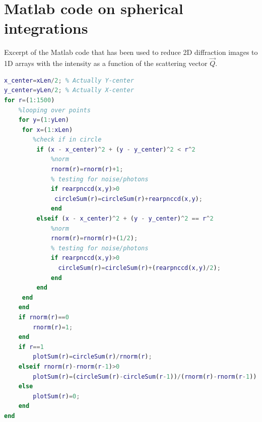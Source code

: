\section{Matlab code on spherical integrations}\label{sec:spherical-integration}
Excerpt of the Matlab code that has been used to reduce 2D diffraction images to 1D arrays with the intensity as a function of the scattering vector $\vec{Q}$.
\begin{lstlisting}[language=matlab,frame=single,basicstyle=\footnotesize]
%%% CENTER OF HIT
x_center=xLen/2; % Actually Y-center
y_center=yLen/2; % Actually X-center
for r=(1:1500)
    %looping over points
    for y=(1:yLen)
     for x=(1:xLen)
        %check if in circle
         if (x - x_center)^2 + (y - y_center)^2 < r^2
             %norm
             rnorm(r)=rnorm(r)+1;
             % testing for noise/photons
             if rearpnccd(x,y)>0
              circleSum(r)=circleSum(r)+rearpnccd(x,y);
             end
         elseif (x - x_center)^2 + (y - y_center)^2 == r^2
             %norm
             rnorm(r)=rnorm(r)+(1/2);
             % testing for noise/photons
             if rearpnccd(x,y)>0
               circleSum(r)=circleSum(r)+(rearpnccd(x,y)/2);
             end
         end
     end
    end
    if rnorm(r)==0
        rnorm(r)=1;
    end
    if r==1
        plotSum(r)=circleSum(r)/rnorm(r);
    elseif rnorm(r)-rnorm(r-1)>0
        plotSum(r)=(circleSum(r)-circleSum(r-1))/(rnorm(r)-rnorm(r-1));
    else
        plotSum(r)=0;
    end
end
\end{lstlisting}
%
%
%
